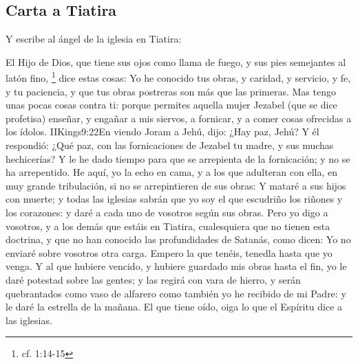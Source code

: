 \subsection*{Carta a Tiatira}
Y escribe al ángel de la iglesia en Tiatira:

El Hijo de Dios, que tiene sus ojos como llama de fuego, y sus pies semejantes al latón fino,%
	\footnote{cf. 1:14-15} %
dice estas cosas:
Yo he conocido tus obras, y caridad, y servicio, y fe, y tu paciencia, y que tus obras postreras son más que las primeras. %
Mas tengo unas pocas cosas contra ti: porque permites aquella mujer Jezabel (que se dice profetisa) enseñar, y engañar a mis siervos, a fornicar, y a comer cosas ofrecidas a los ídolos.%
				 {IIKings}{9:22}{En viendo Joram a Jehú, dijo: ¿Hay paz, Jehú? Y él respondió: ¿Qué paz, con las fornicaciones de Jezabel tu madre, y sus muchas hechicerías?}
Y le he dado tiempo para que se arrepienta de la fornicación; y no se ha arrepentido. %
He aquí, yo la echo en cama, y a los que adulteran con ella, en muy grande tribulación, si no se arrepintieren de sus obras: %
Y mataré a sus hijos con muerte; y todas las iglesias sabrán que yo soy el que escudriño los riñones y los corazones:%
 y daré a cada uno de vosotros según sus obras. %
Pero yo digo a vosotros, y a los demás que estáis en Tiatira, cualesquiera que no tienen esta doctrina, y que no han conocido las profundidades de Satanás, como dicen: Yo no enviaré sobre vosotros otra carga. %
Empero la que tenéis, tenedla hasta que yo venga. %
Y al que hubiere vencido, y hubiere guardado mis obras hasta el fin, yo le daré potestad sobre las gentes; %
y las regirá con vara de hierro, y serán quebrantados como vaso de alfarero%
 como también yo he recibido de mi Padre: %
y le daré la estrella de la mañana. %
El que tiene oído, oiga lo que el Espíritu dice a las iglesias.
